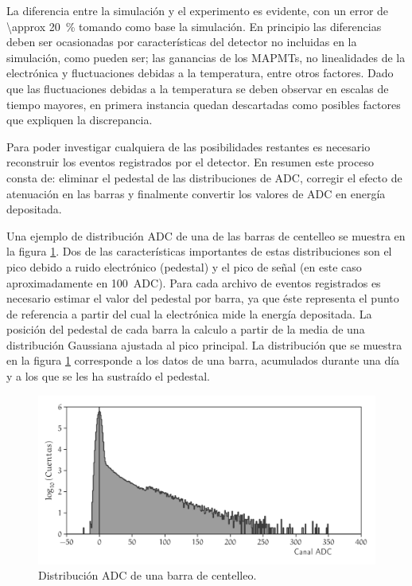 La diferencia entre la simulación y el experimento es evidente, con un error de \SI{\approx 20}{\percent} tomando como base la simulación. En principio las diferencias deben ser ocasionadas por características del detector no incluidas en la simulación, como pueden ser; las ganancias de los MAPMTs, no linealidades de la electrónica y fluctuaciones debidas a la temperatura, entre otros factores. Dado que las fluctuaciones debidas a la temperatura se deben observar en escalas de tiempo mayores, en primera instancia quedan descartadas como posibles factores que expliquen la discrepancia.

Para poder investigar cualquiera de las posibilidades restantes es necesario reconstruir los eventos registrados por el detector. En resumen este proceso consta de: eliminar el pedestal de las distribuciones de ADC, corregir el efecto de atenuación en las barras y finalmente convertir los valores de ADC en energía depositada.

Una ejemplo de distribución ADC de una de las barras de centelleo se muestra en la figura \ref{fig:neutron-pedestal}. Dos de las características importantes de estas distribuciones son el pico debido a ruido electrónico (pedestal) y el pico de señal (en este caso aproximadamente en \SI{100}{ADC}). Para cada archivo de eventos registrados es necesario estimar el valor del pedestal por barra, ya que éste representa el punto de referencia a partir del cual la electrónica mide la energía depositada. La posición del pedestal de cada barra la calculo a partir de la media de una distribución Gaussiana ajustada al pico principal. La distribución que se muestra en la figura \ref{fig:neutron-pedestal} corresponde a los datos de una barra, acumulados durante una día y a los que se les ha sustraído el pedestal.

\begin{figure}
        \centering
        \includegraphics[width=\textwidth]{neutron-ped.pdf}
        \caption{Distribución ADC de una barra de centelleo.}
        \label{fig:neutron-pedestal}
\end{figure}

